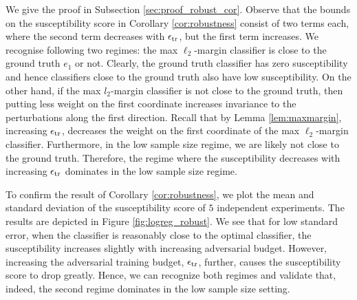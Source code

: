 We give the proof in Subsection \ref{sec:proof_robust_cor}. Observe that the bounds on the susceptibility score in Corollary \ref{cor:robustness} consist of two terms each, where the second term decreases with $\epsilon_{\text{tr}}$, but the first term increases. We recognise following two regimes: the max $\ell_2$-margin classifier is close to the ground truth $e_1$ or not. Clearly, the ground truth classifier has zero susceptibility and hence classifiers close to the ground truth also have low susceptibility. On the other hand, if the max $l_2$-margin classifier is not close to the ground truth, then putting less weight on the first coordinate increases invariance to the perturbations along the first direction. Recall that by Lemma \ref{lem:maxmargin}, increasing $\epsilon_{\text{tr}}$, decreases the weight on the first coordinate of the max $\ell_2$-margin classifier. Furthermore, in the low sample size regime, we are likely not close to the ground truth. Therefore, the regime where the susceptibility decreases with increasing $\epsilon_{\text{tr}}$ dominates in the low sample size regime.

To confirm the result of Corollary \ref{cor:robustness}, we plot the mean and standard deviation of the susceptibility score of $5$ independent experiments. The results are depicted in Figure \ref{fig:logreg_robust}. We see that for low standard error, when the classifier is reasonably close to the optimal classifier, the susceptibility increases slightly with increasing adversarial budget. However, increasing the adversarial training budget, $\epsilon_{\text{tr}}$, further, causes the susceptibility score to drop greatly. Hence, we can recognize both regimes and validate that, indeed, the second regime dominates in the low sample size setting.


